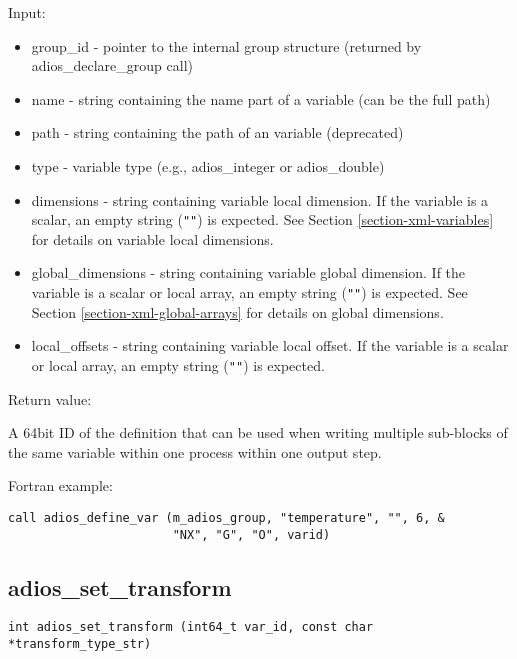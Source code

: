 Input: 
\begin{itemize}
\item group\_id - pointer to the internal group structure (returned by adios\_declare\_group 
call)

\item name - string containing the name part of a variable (can be the full path)

\item path - string containing the path of an variable (deprecated)

\item type - variable type (e.g., adios\_integer or adios\_double) 

\item dimensions - string containing variable local dimension. 
If the variable is a scalar, an empty string (\verb+""+) is expected. 
See Section \ref{section-xml-variables} for details on variable local dimensions.

\item global\_dimensions - string containing variable global dimension. If the variable 
is a scalar or local array, an empty string (\verb+""+) is expected. 
See Section \ref{section-xml-global-arrays} for details on global dimensions.

\item local\_offsets - string containing variable local offset. If the variable is a 
scalar or local array, an empty string (\verb+""+) is expected.
\end{itemize}

Return value:

A 64bit ID of the definition that can be used when writing multiple sub-blocks 
of the same variable within one process within one output step. 

Fortran example: 
\begin{lstlisting}[alsolanguage=Fortran,caption={},label={}]
call adios_define_var (m_adios_group, "temperature", "", 6, &
                       "NX", "G", "O", varid)
\end{lstlisting}

\subsection{adios\_set\_transform}

\begin{lstlisting}[alsolanguage=C,caption={},label={}]
int adios_set_transform (int64_t var_id, const char *transform_type_str)
\end{lstlisting}

